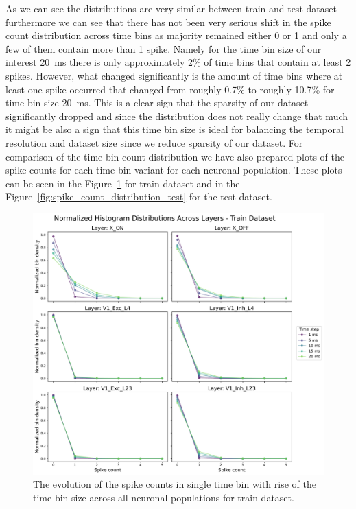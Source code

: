 As we can see the distributions are very similar between train and test dataset furthermore we can see that there has not been very serious shift in the spike count distribution across time bins as majority remained either 0 or 1 and only a few of them contain more than 1 spike. Namely for the time bin size of our interest 20~ms there is only approximately 2\% of time bins that contain at least 2 spikes. However, what changed significantly is the amount of time bins where at least one spike occurred that changed from roughly 0.7\% to roughly 10.7\% for time bin size 20~ms. This is a clear sign that the sparsity of our dataset significantly dropped and since the distribution does not really change that much it might be also a sign that this time bin size is ideal for balancing the temporal resolution and dataset size since we reduce sparsity of our dataset. For comparison of the time bin count distribution we have also prepared plots of the spike counts for each time bin variant for each neuronal population. These plots can be seen in the Figure~\ref{fig:spike_count_distribution_train} for train dataset and in the Figure~\ref{fig:spike_count_distribution_test} for the test dataset.

\begin{figure}
    \centering
    \includegraphics[width=\linewidth]{img/plots/time_step_counts_train.pdf}
    \caption{The evolution of the spike counts in single time bin with rise of the time bin size across all neuronal populations for train dataset.}
    \label{fig:spike_count_distribution_train}
\end{figure}

